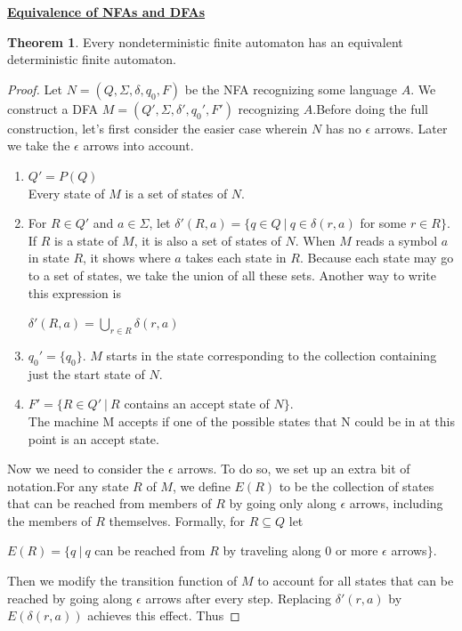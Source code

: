 \documentclass[11pt]{article}
\theoremstyle{definition}
\newtheorem{thm}{Theorem}[section]
\begin{document}
\textbf{\underline{Equivalence of NFAs and DFAs}}
\begin{thm}
Every nondeterministic finite automaton has an equivalent deterministic finite automaton.
\end{thm}
\begin{proof}
    Let $N = (Q, \Sigma, \delta, q_0 , F)$ be the NFA recognizing some language $A$. We construct a DFA $M =(Q',\Sigma,\delta',q_0',F')$ recognizing $A$.Before doing the full construction, let's first consider the easier case wherein $N$ has no $\epsilon$ arrows. Later we take the $\epsilon$ arrows into account.
    \begin{enumerate}
        \item $Q' = P(Q)$\\
        Every state of $M$ is a set of states of $N$.
        \item For $R \in Q'$ and $a \in \Sigma$, let $\delta'(R, a) = \{q \in Q\ |\ q \in \delta(r, a)$ for some $r \in R\}$. If $R$ is a state of $M$, it is also a set of states of $N$. When $M$ reads a symbol $a$ in state $R$, it shows where $a$ takes each state in $R$. Because each state may go to a set of states, we take the union of all these sets. Another way to write this expression is
        \begin{center}
            $\delta'(R,a) = \bigcup_{r\in R} \delta(r,a)$
        \end{center}
        \item $q_0'=\{q_0\}$. $M$ starts in the state corresponding to the collection containing just the start state of $N$.
        \item $F' = \{R\in Q'\ |\ R$ contains an accept state of $N\}$.\\
        The machine M accepts if one of the possible states that N could be in at this point is an accept state.
    \end{enumerate}
    Now we need to consider the $\epsilon$ arrows. To do so, we set up an extra bit of notation.For any state $R$ of $M$, we define $E(R)$ to be the collection of states that can be reached from members of $R$ by going only along $\epsilon$ arrows, including the members of $R$ themselves. Formally, for $R \subseteq Q$ let 
    \begin{center}
        $E(R) = \{q\ |\ q$ can be reached from $R$ by traveling along 0 or more $\epsilon$ arrows$\}$.
    \end{center}
    Then we modify the transition function of $M$ to account for all states that can be reached by going along $\epsilon$ arrows after every step. Replacing $\delta'(r,a)$ by $E(\delta(r, a))$ achieves this effect. Thus

\end{proof}
\end{document}
